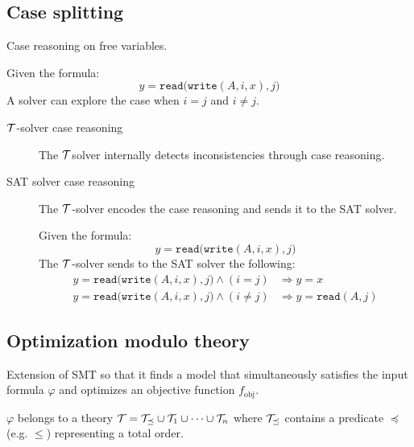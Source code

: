 \subsection{Case splitting}

Case reasoning on free variables.
\begin{example}
    Given the formula:
    \[ y = \texttt{read}\big( \texttt{write}(A, i, x), j \big) \]
    A solver can explore the case when $i = j$ and $i \neq j$.
\end{example}

\begin{description}
    \item[$\mathcal{T}$-solver case reasoning] 
        The $\mathcal{T}$solver internally detects inconsistencies through case reasoning.

    \item[SAT solver case reasoning] 
        The $\mathcal{T}$-solver encodes the case reasoning and sends it to the SAT solver.
        \begin{example}
            Given the formula:
            \[ y = \texttt{read}\big( \texttt{write}(A, i, x), j \big) \]
            The $\mathcal{T}$-solver sends to the SAT solver the following:
            \[
                \begin{split}
                    y = \texttt{read}\big( \texttt{write}(A, i, x), j \big) \land (i = j) &\Rightarrow y = x \\
                    y = \texttt{read}\big( \texttt{write}(A, i, x), j \big) \land (i \neq j) &\Rightarrow y = \texttt{read}(A, j)
                \end{split}    
            \]
        \end{example}
\end{description}



\subsection{Optimization modulo theory}

Extension of SMT so that it finds a model that simultaneously satisfies the input formula $\varphi$ and optimizes an objective function $f_\text{obj}$.

$\varphi$ belongs to a theory $\mathcal{T} = \mathcal{T}_{\preceq} \cup \mathcal{T}_1 \cup \dots \cup \mathcal{T}_n$
where $\mathcal{T}_{\preceq}$ contains a predicate $\preceq$ (e.g. $\leq$) representing a total order.

